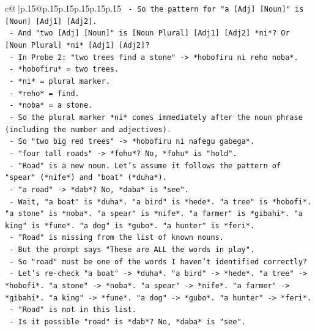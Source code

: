 \documentclass{article}
\begin{document}
{\begin{supertabular}{c@{$\;$}|p{.15\linewidth}@{}p{.15\linewidth}p{.15\linewidth}p{.15\linewidth}p{.15\linewidth}p{.15\linewidth}}
{{{\texttt{            {-} So the pattern for "a {[}Adj{]} {[}Noun{]}" is {[}Noun{]} {[}Adj1{]} {[}Adj2{]}.} \\
\texttt{            {-} And "two {[}Adj{]} {[}Noun{]}" is {[}Noun Plural{]} {[}Adj1{]} {[}Adj2{]} *ni*? Or {[}Noun Plural{]} *ni* {[}Adj1{]} {[}Adj2{]}?} \\
\texttt{            {-} In Probe 2: "two trees find a stone" {-}> *hobofiru ni reho noba*.} \\
\texttt{              {-} *hobofiru* = two trees.} \\
\texttt{              {-} *ni* = plural marker.} \\
\texttt{              {-} *reho* = find.} \\
\texttt{              {-} *noba* = a stone.} \\
\texttt{            {-} So the plural marker *ni* comes immediately after the noun phrase (including the number and adjectives).} \\
\texttt{            {-} So "two big red trees" {-}> *hobofiru ni nafegu gabega*.} \\
\texttt{            {-} "four tall roads" {-}> *fohu*? No, *fohu* is "hold".} \\
\texttt{            {-} "Road" is a new noun. Let's assume it follows the pattern of "spear" (*nife*) and "boat" (*duha*).} \\
\texttt{            {-} "a road" {-}> *dab*? No, *daba* is "see".} \\
\texttt{            {-} Wait, "a boat" is *duha*. "a bird" is *hede*. "a tree" is *hobofi*. "a stone" is *noba*. "a spear" is *nife*. "a farmer" is *gibahi*. "a king" is *fune*. "a dog" is *gubo*. "a hunter" is *feri*.} \\
\texttt{            {-} "Road" is missing from the list of known nouns.} \\
\texttt{            {-} But the prompt says "These are ALL the words in play".} \\
\texttt{            {-} So "road" must be one of the words I haven't identified correctly?} \\
\texttt{            {-} Let's re{-}check "a boat" {-}> *duha*. "a bird" {-}> *hede*. "a tree" {-}> *hobofi*. "a stone" {-}> *noba*. "a spear" {-}> *nife*. "a farmer" {-}> *gibahi*. "a king" {-}> *fune*. "a dog" {-}> *gubo*. "a hunter" {-}> *feri*.} \\
\texttt{            {-} "Road" is not in this list.} \\
\texttt{            {-} Is it possible "road" is *dab*? No, *daba* is "see".} \\
}}}
\end{supertabular}}
\end{document}
